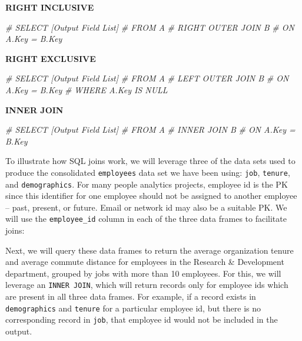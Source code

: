 \documentclass[]{book}
\newenvironment{Shaded}{\begin{snugshade}}{\end{snugshade}}
\newcommand{\CommentTok}[1]{\textcolor[rgb]{0.56,0.35,0.01}{\textit{#1}}}
\begin{document}
\textbf{RIGHT INCLUSIVE}

\begin{Shaded}
\begin{Highlighting}[]
\CommentTok{#  SELECT [Output Field List]}
\CommentTok{#  FROM A }
\CommentTok{#  RIGHT OUTER JOIN B}
\CommentTok{#  ON A.Key = B.Key}
\end{Highlighting}
\end{Shaded}

\textbf{RIGHT EXCLUSIVE}

\begin{Shaded}
\begin{Highlighting}[]
\CommentTok{#  SELECT [Output Field List]}
\CommentTok{#  FROM A }
\CommentTok{#  LEFT OUTER JOIN B}
\CommentTok{#  ON A.Key = B.Key}
\CommentTok{#  WHERE A.Key IS NULL}
\end{Highlighting}
\end{Shaded}

\textbf{INNER JOIN}

\begin{Shaded}
\begin{Highlighting}[]
\CommentTok{#  SELECT [Output Field List]}
\CommentTok{#  FROM A }
\CommentTok{#  INNER JOIN B}
\CommentTok{#  ON A.Key = B.Key}
\end{Highlighting}
\end{Shaded}

To illustrate how SQL joins work, we will leverage three of the data sets used to produce the consolidated \texttt{employees} data set we have been using: \texttt{job}, \texttt{tenure}, and \texttt{demographics}. For many people analytics projects, employee id is the PK since this identifier for one employee should not be assigned to another employee -- past, present, or future. Email or network id may also be a suitable PK. We will use the \texttt{employee\_id} column in each of the three data frames to facilitate joins:

Next, we will query these data frames to return the average organization tenure and average commute distance for employees in the Research \& Development department, grouped by jobs with more than 10 employees. For this, we will leverage an \texttt{INNER\ JOIN}, which will return records only for employee ids which are present in all three data frames. For example, if a record exists in \texttt{demographics} and \texttt{tenure} for a particular employee id, but there is no corresponding record in \texttt{job}, that employee id would not be included in the output.
\end{document}
